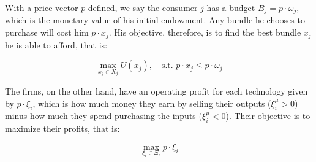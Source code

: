 With a price vector $p$ defined, we say the consumer $j$ has a budget
$B_j = p\cdot \omega_j$, which is the monetary value of his initial
endowment. Any bundle he chooses to purchase will cost him
$p\cdot x_j$. His objective, therefore, is to find the best bundle
$x_j$ he is able to afford, that is:

\begin{equation}
  \label{eq:consumer_obj}
  \max_{x_j \in X_j} U(x_j), \quad \text{s.t. } p\cdot x_j \leq p\cdot \omega_j
\end{equation}

The firms, on the other hand, have an operating profit for each
technology given by $p \cdot \xi_i$, which is how much money they earn
by selling their outputs ($\xi_i^\mu > 0$) minus how much they spend
purchasing the inputs ($\xi_i^\mu < 0$). Their objective is to maximize
their profits, that is:

\begin{equation}
  \label{eq:firm_obj}
  \max_{\xi_i \in \Xi_i} p \cdot \xi_i
\end{equation}







\cite{thurner} \cite{Schumpeter39} \cite{savage} \cite{mascolell}
\cite{Roughgarden10, Gintis07}
\cite{Tversky74, Kahneman79, Tversky81}
